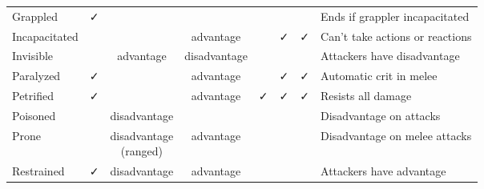 \documentclass[letterpaper,landscape,12pt]{article}
\begin{document}
\begin{table}[h!]
\begin{tabular}{@{}l c c c c c c l@{}}
Grappled           & ✓                                            &                                                &                                              &                                     &                                        &                                     & Ends if grappler incapacitated \\ 
Incapacitated      &                                              &                                                & \parbox{2.5cm}{\centering advantage}           &                                     & ✓                                      & ✓                                   & Can't take actions or reactions \\ 
Invisible          &                                              & \parbox{2.5cm}{\centering advantage}             & \parbox{2.5cm}{\centering disadvantage}        &                                     &                                        &                                     & Attackers have disadvantage \\ 
Paralyzed          & ✓                                            &                                                & \parbox{2.5cm}{\centering advantage}           &                                     & ✓                                      & ✓                                   & Automatic crit in melee \\ 
Petrified          & ✓                                            &                                                & \parbox{2.5cm}{\centering advantage}           & ✓                                   & ✓                                      & ✓                                   & Resists all damage \\ 
Poisoned           &                                              & \parbox{2.5cm}{\centering disadvantage}          &                                              &                                     &                                        &                                     & Disadvantage on attacks \\ 
Prone              &                                              & \parbox{2.5cm}{\centering disadvantage \\ (ranged)} & \parbox{2.5cm}{\centering advantage}           &                                     &                                        &                                     & Disadvantage on melee attacks \\ 
Restrained         & ✓                                            & \parbox{2.5cm}{\centering disadvantage}          & \parbox{2.5cm}{\centering advantage}           &                                     &                                        &                                     & Attackers have advantage \\ 

\end{tabular}
\end{table}
\end{document}
